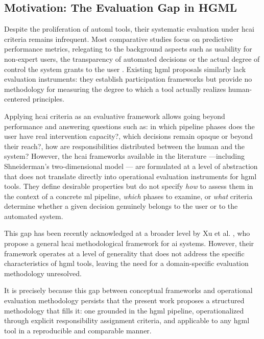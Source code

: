 \subsection{Motivation: The Evaluation Gap in HGML}

Despite the proliferation of \gls{automl} tools, their systematic evaluation under \gls{hcai} criteria remains infrequent. Most comparative studies focus on predictive performance metrics, relegating to the background aspects such as usability for non-expert users, the transparency of automated decisions or the actual degree of control the system grants to the user \cite{hartikainen2022human}. Existing \gls{hgml} proposals \cite{gil2019towards,lindauer2024position} similarly lack evaluation instruments: they establish participation frameworks but provide no methodology for measuring the degree to which a tool actually realizes human-centered principles.

Applying \gls{hcai} criteria as an evaluative framework allows going beyond performance and answering questions such as: in which pipeline phases does the user have real intervention capacity?, which decisions remain opaque or beyond their reach?, how are responsibilities distributed between the human and the system? However, the \gls{hcai} frameworks available in the literature ---including Shneiderman's two-dimensional model \cite{shneiderman2022human}--- are formulated at a level of abstraction that does not translate directly into operational evaluation instruments for \gls{hgml} tools. They define desirable properties but do not specify \textit{how} to assess them in the context of a concrete \gls{ml} pipeline, \textit{which} phases to examine, or \textit{what} criteria determine whether a given decision genuinely belongs to the user or to the automated system.

This gap has been recently acknowledged at a broader level by Xu et al. \cite{xu2026hcai}, who propose a general \gls{hcai} methodological framework for \gls{ai} systems. However, their framework operates at a level of generality that does not address the specific characteristics of \gls{hgml} tools, leaving the need for a domain-specific evaluation methodology unresolved.

It is precisely because this gap between conceptual frameworks and operational evaluation methodology persists that the present work proposes a structured methodology that fills it: one grounded in the \gls{hgml} pipeline, operationalized through explicit responsibility assignment criteria, and applicable to any \gls{hgml} tool in a reproducible and comparable manner.